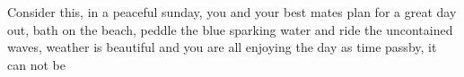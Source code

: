 Consider this, in a peaceful sunday, you and your best mates plan for a great day out, bath on the beach, peddle the blue sparking water and ride the uncontained waves, weather is beautiful and you are all enjoying the day as time passby, it can not be 